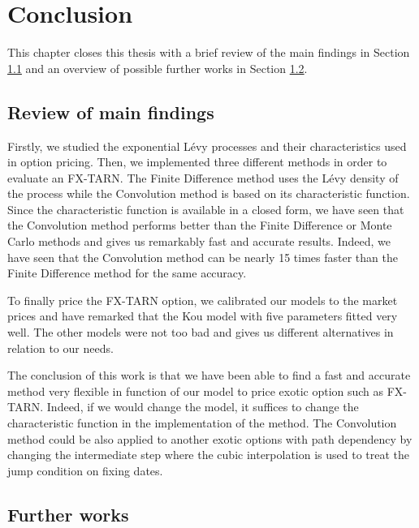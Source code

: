 \chapter{Conclusion}
\label{sec:conclusion}


This chapter closes this thesis with a brief review of the main findings in Section \ref{sec:conclusion:review} and an overview of possible further works in Section \ref{sec:conclusion:works}.

\section{Review of main findings}
\label{sec:conclusion:review}
Firstly, we studied the exponential L\'evy processes and their characteristics used in option pricing. Then, we implemented three different methods in order to evaluate an FX-TARN. The Finite Difference method uses the L\'evy density of the process while the Convolution method is based on its characteristic function. Since the characteristic function is available in a closed form, we have seen that the Convolution method performs better than the Finite Difference or Monte Carlo methods and gives us remarkably fast and accurate results. Indeed, we have seen that the Convolution method can be nearly 15 times faster than the Finite Difference method for the same accuracy.

To finally price the FX-TARN option, we calibrated our models to the market prices and have remarked that the Kou model with five parameters fitted very well. The other models were not too bad and gives us different alternatives in relation to our needs. 

The conclusion of this work is that we have been able to find a fast and accurate method very flexible in function of our model to price exotic option such as FX-TARN. Indeed, if we would change the model, it suffices to change the characteristic function in the implementation of the method. The Convolution method could be also applied to another exotic options with path dependency by changing the intermediate step where the cubic interpolation is used to treat the jump condition on fixing dates.

\section{Further works}
\label{sec:conclusion:works}

